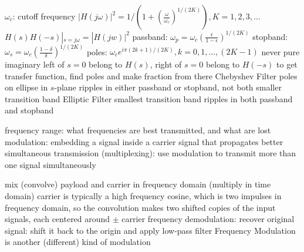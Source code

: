\documentclass[12pt]{article}
\begin{document}
\begin{multicols*}{2}
\begin{flushleft}
\begin{outline}[longenum]
    \2 $\omega_c$: cutoff frequency
    \2 $|H(j\omega)|^2 = 1/(1+(\frac{\omega}{\omega_c})^{1/(2K)}), K=1,2,3,\ldots$
    \\ $H(s)H(-s)|_{s=j\omega}=|H(jw)|^2$
    \2 passband: $\omega_p = \omega_c(\frac{\epsilon}{1-\epsilon})^{1/(2K)}$
    \2 stopband: $\omega_s = \omega_c(\frac{1-\delta}{\delta})^{1/(2K)}$
    \2 poles: $\omega_c e^{i\pi (2k+1)/(2K)}, k=0,1,\ldots,(2K-1)$
      \3 never pure imaginary
      \3 left of $s=0$ belong to $H(s)$, right of $s=0$ belong to $H(-s)$
    \2 to get transfer function, find poles and make fraction from there
  \1 Chebyshev Filter
    \2 poles on ellipse in $s$-plane
    \2 ripples in either passband or stopband, not both
    \2 smaller transition band
  \1 Elliptic Filter
    \2 smallest transition band
    \2 ripples in both passband and stopband

  \1 frequency range: what frequencies are best transmitted, and what are lost
  \1 modulation: embedding a signal inside a carrier signal that propagates better
  \1 simultaneous transmission (multiplexing): use modulation to transmit more than one signal simultaneously

  \1 mix (convolve) payload and carrier in frequency domain (multiply in time domain)
  \1 carrier is typically a high frequency cosine, which is two impulses in frequency domain, so the convolution makes two shifted copies of the input signals, each centered around $\pm$ carrier frequency
  \1 demodulation: recover original signal: shift it back to the origin and apply low-pass filter
  \1 Frequency Modulation is another (different) kind of modulation



\end{outline}
\end{flushleft}
\end{multicols*}
\end{document}
